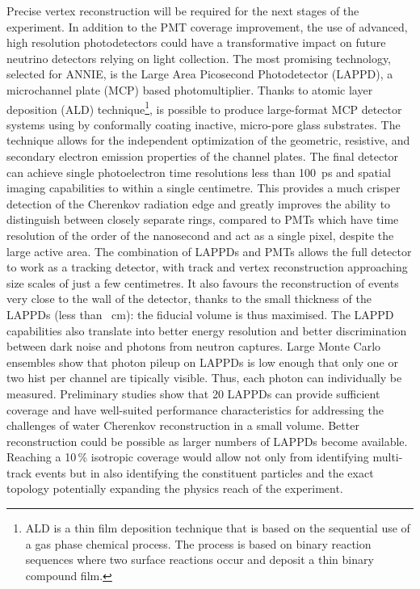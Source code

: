  Precise vertex reconstruction will be required for the next stages of the experiment.
 In addition to the PMT coverage improvement, the use of advanced, high resolution photodetectors %
 could have a transformative impact on future neutrino detectors relying on light collection.
 The most promising technology, selected for ANNIE, is the Large Area Picosecond Photodetector %
 (LAPPD), a microchannel plate (MCP) based photomultiplier.
 Thanks to atomic layer deposition (ALD) technique\footnote{ALD is a thin film deposition technique that %
 is based on the sequential use of a gas phase chemical process. The process is based on binary reaction %
 sequences where two surface reactions occur and deposit a thin binary compound film.}, %
 is possible to produce large-format MCP detector systems using by conformally coating inactive, %
 micro-pore glass substrates.
 The technique allows for the independent optimization of the geometric, resistive, and secondary electron emission %
 properties of the channel plates.
 The final detector can achieve single photoelectron time resolutions less than 100~ps and spatial imaging %
 capabilities to within a single centimetre.
 This provides a much crisper detection of the Cherenkov radiation edge and greatly improves the %
 ability to distinguish between closely separate rings, compared to PMTs which have time resolution %
 of the order of the nanosecond and act as a single pixel, despite the large active area.
 The combination of LAPPDs and PMTs allows the full detector to work as a tracking detector, %
 with track and vertex reconstruction approaching size scales of just a few centimetres.
 It also favours the reconstruction of events very close to the wall of the detector, %
 thanks to the small thickness of the LAPPDs (less than ~cm): the fiducial volume is thus maximised.
 The LAPPD capabilities also translate into better energy resolution and better discrimination %
 between dark noise and photons from neutron captures.
 Large Monte Carlo ensembles show that photon pileup on LAPPDs is low enough that only one or two hist per channel %
 are tipically visible.
 Thus, each photon can individually be measured.
 Preliminary studies show that 20 LAPPDs can provide sufficient coverage and have well-suited %
 performance characteristics for addressing the challenges of water Cherenkov reconstruction in a small volume. 
 Better reconstruction could be possible as larger numbers of LAPPDs become available.
 Reaching a 10\,\% isotropic coverage would allow not only from identifying multi-track %
 events but in also identifying the constituent particles and the exact topology potentially %
 expanding the physics reach of the experiment.

